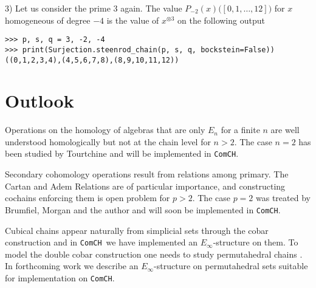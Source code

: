 \documentclass{amsart}
\newcommand{\comch}{\texttt{ComCH}}
\begin{document}
3) Let us consider the prime $3$ again. The value $P_{-2}(x)\big([0,1,\dots,12]\big)$ for $x$ homogeneous of degree $-4$ is the value of $x^{\otimes 3}$ on the following output
\begin{Verbatim}[frame=single, samepage=true]
>>> p, s, q = 3, -2, -4
>>> print(Surjection.steenrod_chain(p, s, q, bockstein=False))
((0,1,2,3,4),(4,5,6,7,8),(8,9,10,11,12))
\end{Verbatim}

\section{Outlook}

Operations on the homology of algebras that are only $E_n$ for a finite $n$ are well understood homologically \cite{Cohen76} but not at the chain level for $n>2$. The case $n=2$ has been studied by Tourtchine \cite{Tourtchine06} and will be implemented in \comch.

Secondary cohomology operations result from relations among primary. The Cartan and Adem Relations are of particular importance, and constructing cochains enforcing them is open problem for $p > 2$. The case $p = 2$ was treated by Brumfiel, Morgan and the author \cite{medina2020cartan, brumfiel2020cochain} and will soon be implemented in \comch.

Cubical chains appear naturally from simplicial sets through the cobar construction \cite{Baues1980} and in \comch\, we have implemented an $E_\infty$-structure on them. To model the double cobar construction one needs to study permutahedral chains \cite{Kadeishvili2002}. In forthcoming work we describe an $E_\infty$-structure on permutahedral sets suitable for implementation on \comch.


\end{document}
